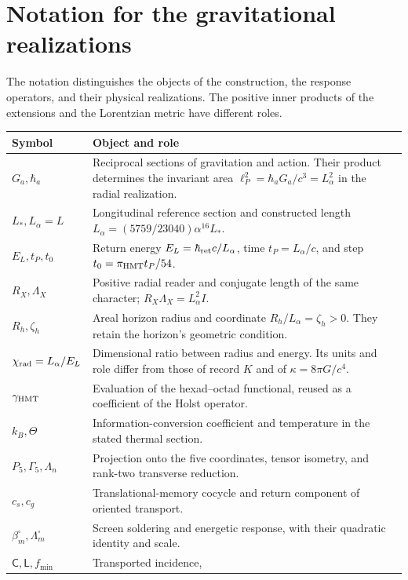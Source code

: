 \begingroup\fontsize{9.3}{10.7}\selectfont\setlength{\parskip}{1pt}
\section{Notation for the gravitational realizations}
The notation distinguishes the objects of the construction, the response
operators, and their physical realizations. The positive inner products
of the extensions and the Lorentzian metric have different roles.
\renewcommand{\arraystretch}{1.0}\begin{longtable}{@{}p{.23\linewidth}p{.72\linewidth}@{}}
\toprule
Symbol & Object and role\\ \midrule
\endhead
\(G_a,\hbar_a\) & Reciprocal sections of gravitation and action.
Their product determines the invariant area
\(\ell_P^2=\hbar_aG_a/c^3=L_\alpha^2\) in the radial realization.\\
\(L_*,L_\alpha=L\) & Longitudinal reference section and constructed
length \(L_\alpha=(5759/23040)\alpha^{16}L_*\).\\
\(E_L,t_P,t_0\) & Return energy \(E_L=\hbar_{\rm ret}c/L_\alpha\),
time \(t_P=L_\alpha/c\), and step \(t_0=\pi_{\rm HMT}t_P/54\).\\
\(R_X,\Lambda_X\) & Positive radial reader and conjugate length of
the same character; \(R_X\Lambda_X=L_\alpha^2I\).\\
\(R_h,\zeta_h\) & Areal horizon radius and coordinate
\(R_h/L_\alpha=\zeta_h>0\). They retain the horizon's geometric condition.\\
\(\chi_{\rm rad}=L_\alpha/E_L\) & Dimensional ratio between radius
and energy. Its units and role differ from those of record \(K\)
and of \(\kappa=8\pi G/c^4\).\\
\(\gamma_{\rm HMT}\) & Evaluation of the hexad--octad functional,
reused as a coefficient of the Holst operator.\\
\(k_B,\Theta\) & Information-conversion coefficient and temperature
in the stated thermal section.\\
\(P_5,\Gamma_5,\Lambda_n\) & Projection onto the five coordinates,
tensor isometry, and rank-two transverse reduction.\\
\(c_s,c_g\) & Translational-memory cocycle and return component
of oriented transport.\\
\(\beta_m^\square,\Lambda_m^\square\) & Screen soldering and
energetic response, with their quadratic identity and scale.\\
\(\mathsf C,\mathsf L,f_{\min}\) & Transported incidence,

\end{longtable}
